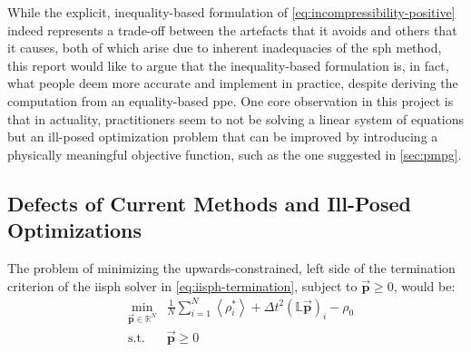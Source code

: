 \documentclass[conference]{IEEEtran}
\newcommand\vek[1]{\vec{\bm{#1}}}
\newcommand\mat[1]{{\mathds{#1}}}
\newcommand\br[1]{\left(#1\right)}
\newcommand\abr[1]{\left\langle#1\right\rangle}
\begin{document}
While the explicit, inequality-based formulation of \autoref{eq:incompressibility-positive} indeed represents a trade-off between the artefacts that it avoids and others that it causes, both of which arise due to inherent inadequacies of the \ac{sph} method, this report would like to argue that the inequality-based formulation is, in fact, what people deem more accurate and implement in practice, despite deriving the computation from an equality-based \ac{ppe}. One core observation in this project is that in actuality, practitioners seem to not be solving a linear system of equations but an ill-posed optimization problem that can be improved by introducing a physically meaningful objective function, such as the one suggested in \autoref{sec:pmpg}.



\subsection{Defects of Current Methods and Ill-Posed Optimizations}


The problem of minimizing the upwards-constrained, left side of the termination criterion of the \ac{iisph} solver in \autoref{eq:iisph-termination}, subject to $\vek{p}\geq 0$, would be:
\begin{equation}\label{eq:ill-posed-problem}
  \begin{aligned}
    &\min_{\vek{p}\in\mathds{R}^N} & \frac{1}{N}\sum_{i=1}^{N}
      \abr{\rho_i^*} + \Delta t^2 \br{\mat{L}\vek{p}}_i -\rho_0 \\
    &\text{s.t.} & \vek{p} \geq 0
  \end{aligned}
\end{equation}
\end{document}
